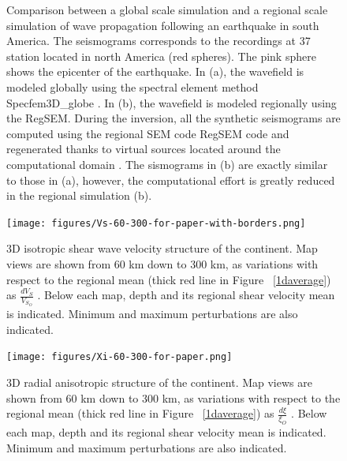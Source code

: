 \documentclass[12pt]{article}
\begin{document}
\begin{figure}
		\caption{\baselineskip 18pt 
			Comparison between a global scale simulation and a regional scale simulation of wave propagation following an earthquake in south America. The seismograms corresponds to the recordings at 37 station located in north America (red spheres).
			The pink sphere shows the epicenter of the earthquake. In (a), the wavefield is modeled globally using the spectral element method Specfem3D\_globe \citep{komatitsch2002spectrala}. In (b), the wavefield is modeled regionally using the RegSEM. During the inversion, all the synthetic seismograms are computed using the regional SEM code RegSEM \citep{cupillard2012regsem} code and regenerated thanks to virtual sources located around the computational domain \citep[see][]{masson2013numerical}. The sismograms in (b) are exactly similar to those in (a), however, the computational effort is greatly reduced in the regional simulation (b).}

		\label{injection}

	\end{figure}

	\begin{figure}
		\centering
		\texttt{[image: figures/Vs-60-300-for-paper-with-borders.png]}

		\caption{\baselineskip 18pt
		3D isotropic shear wave velocity structure of the continent. Map views are shown from 60 km down to 300 km, as variations with respect to the regional mean (thick red line in Figure ~\ref{1daverage}) as $\frac{dV_S}{V_{S_{O}}}$ . 
		Below each map, depth and its regional shear velocity mean is indicated. Minimum and maximum perturbations are also indicated.
		}

		\label{3d-VS}

	\end{figure}

	\begin{figure}
		\centering
		\texttt{[image: figures/Xi-60-300-for-paper.png]}

		\caption{\baselineskip 18pt
		3D radial anisotropic structure of the continent. Map views are shown from 60 km down to 300 km, as variations with respect to the regional mean (thick red line in Figure ~\ref{1daverage}) as $\frac{d\xi}{\xi_{O}}$ . 
		Below each map, depth and its regional shear velocity mean is indicated. Minimum and maximum perturbations are also indicated.
		}

		\label{3d-Xi}

	\end{figure}
\end{document}

